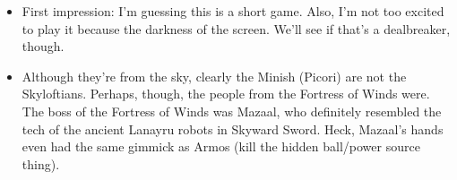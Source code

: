 \newpage

\etocsettocstyle{}{}
\localtableofcontents


\newpage
{}



\newpage
{}



\newpage
{}
\begin{itemize}
	\item{First impression: I'm guessing this is a short game. Also, I'm not too excited to play it because the darkness of the screen. We'll see if that's a dealbreaker, though.}
\end{itemize}


\newpage
{}
\begin{itemize}
	\item{Although they're from the sky, clearly the Minish (Picori) are not the Skyloftians. Perhaps, though, the people from the Fortress of Winds were. The boss of the Fortress of Winds was Mazaal, who definitely resembled the tech of the ancient Lanayru robots in Skyward Sword.
	Heck, Mazaal's hands even had the same gimmick as Armos (kill the hidden ball/power source thing).
	}
\end{itemize}



